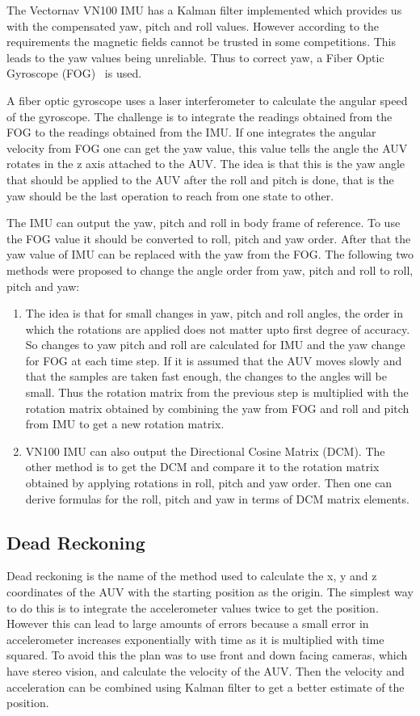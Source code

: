 The Vectornav VN100 IMU has a Kalman
filter implemented which provides us with the compensated yaw, pitch and roll
values. However according to the requirements the magnetic fields cannot be
trusted in some competitions. This leads to the yaw values being unreliable.
Thus to correct yaw, a Fiber Optic Gyroscope (FOG)~\cite{web:fog1} is used.

A fiber optic gyroscope uses a laser interferometer to calculate the angular
speed of the gyroscope. The challenge is to
integrate the readings obtained from the FOG to the readings obtained from
the IMU. If one integrates the angular velocity from FOG one can get the yaw value, 
this value tells the angle the AUV rotates in the z axis attached to the AUV.
The idea is that this is the yaw angle that should be applied to the AUV after
the roll and pitch is done, that is the yaw should be the last operation to
reach from one state to other.

The IMU can output the yaw, pitch and roll in body frame of reference.
To use the FOG value it should be converted to roll, pitch and yaw order.
After that the yaw value of IMU can be replaced with the yaw from the FOG.
The following two methods were proposed to change the angle order from yaw,
pitch and roll to roll, pitch and yaw:
\begin{enumerate}
\item The idea is that for small changes in yaw, pitch and roll angles,
    the order in which the rotations are applied does not matter upto first
    degree of accuracy. So changes to yaw pitch and roll are calculated for
    IMU and the yaw change for FOG at each time step. If it is assumed that
    the AUV moves slowly and that the samples are taken fast enough, the changes
    to the angles will be small. Thus the rotation matrix from the previous
    step is multiplied with the rotation matrix obtained by combining the yaw
    from FOG and roll and pitch from IMU to get a new rotation matrix.
\item VN100 IMU can also output the Directional Cosine Matrix (DCM). The other method is to
    get the DCM and compare it to the rotation matrix obtained by
    applying rotations in roll, pitch and yaw order. Then one can derive
    formulas for the roll, pitch and yaw in terms of DCM matrix elements.
\end{enumerate}

\subsection{Dead Reckoning}
Dead reckoning is the name of the method used to calculate the x, y and z
coordinates of the AUV with the starting position as the origin.
The simplest way to do this is to integrate the accelerometer values
twice to get the position. However this can lead to large amounts of errors
because a small error in accelerometer increases exponentially with
time as it is multiplied with time squared. To avoid this the plan was
to use front and down facing cameras, which have stereo vision, and
calculate the velocity of the AUV. Then the velocity and acceleration
can be combined using Kalman filter to get a better estimate of the position.
